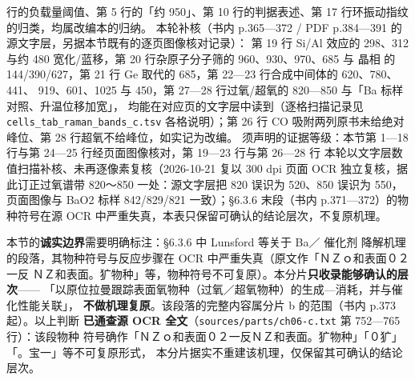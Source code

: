 {行的负载量阈值、第 5 行的「约 950」、第 10 行的判据表述、第 17 行环振动指纹的归类，均属改编本的归纳。
本轮补核（书内 p.365—372 / PDF p.384—391 的源文字层，另据本节既有的逐页图像核对记录）：
第 19 行 Si/Al 效应的 298、312 与约 480 宽化/蓝移，第 20 行杂原子分子筛的 960、930、970、685 与
晶相  的 144/390/627，第 21 行 Ge 取代的 685，第 22—23 行合成中间体的 620、780、441、
919、601、1025 与 450，第 27—28 行过氧/超氧的 820—850 与「Ba 标样对照、升温位移加宽」，
均能在对应页的文字层中读到（逐格扫描记录见 \texttt{cells\_tab\_raman\_bands\_c.tsv}
各格说明）；第 26 行 CO 吸附两列原书未给绝对峰位、第 28 行超氧不给峰位，如实记为改编。
须声明的证据等级：本节第 1—18 行与第 24—25 行经页面图像核对，第 19—23 行与第 26—28 行
本轮以文字层数值扫描补核、未再逐像素复核（2026-10-21 复以 300 dpi 页面 OCR 独立复核，据此订正过氧谱带 820～850 一处：源文字层把 820 误识为 520、850 误识为 550，页面图像与 BaO2 标样 842/829/821 一致）；\S6.3.6 末段（书内 p.371—372）的物种符号在源
OCR 中严重失真，本表只保留可确认的结论层次，不复原机理。

\par\addvspace{2pt}
\par}

\begin{pitfall}
本节的\textbf{诚实边界}需要明确标注：§6.3.6 中 Lunsford 等关于 Ba／ 催化剂
降解机理的段落，其物种符号与反应步骤在 OCR 中严重失真（原文作「ＮＺｏ和表面０２一反
ＮＺ和表面。犷物种」等，物种符号不可复原）。本分片\textbf{只收录能够确认的层次}——
「以原位拉曼跟踪表面氧物种（过氧／超氧物种）的生成—消耗，并与催化性能关联」，
\textbf{不做机理复原}。该段落的完整内容属分片 b 的范围（书内 p.373 起）。以上判断
\textbf{已通查源 OCR 全文}（\texttt{sources/parts/ch06-c.txt} 第 752—765 行）：该段物种
符号确作「ＮＺｏ和表面０２一反ＮＺ和表面。犷物种」「０犷」「。宝一」等不可复原形式，
本分片据实不重建该机理，仅保留其可确认的结论层次。
\end{pitfall}

